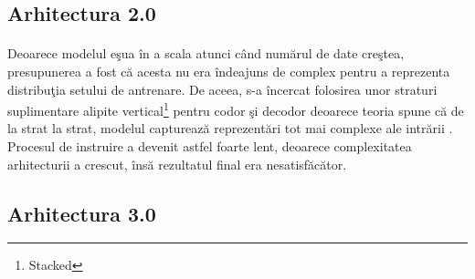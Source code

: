 \subsection{Arhitectura 2.0}

\paragraph{}
Deoarece modelul e\c sua \^ in a scala atunci c\^ and num\u arul de date cre\c stea, presupunerea a fost c\u a acesta nu era \^ indeajuns de complex pentru a reprezenta distribu\c tia setului de antrenare. De aceea, s-a \^ incercat folosirea unor straturi suplimentare alipite vertical\footnote{Stacked} pentru codor \c si decodor deoarece teoria spune c\u a de la strat la strat, modelul captureaz\u a reprezent\u ari tot mai complexe ale intr\u arii \cite{cnn-features}. Procesul de instruire a devenit astfel foarte lent, deoarece complexitatea arhitecturii a crescut, \^ ins\u a rezultatul final era nesatisf\u ac\u ator. 

\subsection{Arhitectura 3.0}

